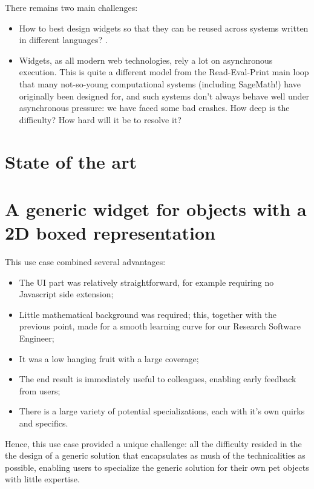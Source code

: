 \documentclass{deliverablereport}
\begin{document}
There remains two main challenges:
\begin{itemize}
\item How to best design widgets so that they can be reused across
  systems written in different languages? . 
\item Widgets, as all modern web technologies, rely a lot on
  asynchronous execution. This is quite a different model from the
  Read-Eval-Print main loop that many not-so-young computational
  systems (including SageMath!) have originally been designed for, and
  such systems don't always behave well under asynchronous pressure:
  we have faced some bad crashes. How deep is the difficulty? How hard
  will it be to resolve it?
\end{itemize}

\section{State of the art}


\section{A generic widget for objects with a 2D boxed representation}
\label{grid}



This use case combined several advantages:
\begin{itemize}
\item The UI part was relatively straightforward, for example
  requiring no Javascript side extension;
\item Little mathematical background was required; this, together with
  the previous point, made for a smooth learning curve for our
  Research Software Engineer;
\item It was a low hanging fruit with a large coverage;
\item The end result is immediately useful to colleagues, enabling
  early feedback from users;
\item There is a large variety of potential specializations, each with
  it's own quirks and specifics.
\end{itemize}
Hence, this use case provided a unique challenge: all the difficulty
resided in the the design of a generic solution that encapsulates as
mush of the technicalities as possible, enabling users to specialize
the generic solution for their own pet objects with little expertise.
\end{document}
